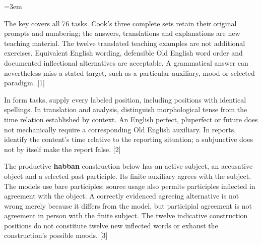 \newcommand{\runningtitle}{Unit 12. Answer key}

\emergencystretch=3em
\newcommand{\itempara}[2]{\par\addvspace{3pt}\noindent\hangindent=1.8em\hangafter=1\makebox[1.8em][l]{#1.}#2\par}
\newcommand{\reserve}[1]{\par\penalty-100\begingroup\dimen0=\pagegoal\advance\dimen0 by-\pagetotal\ifdim\dimen0<#1\newpage\fi\endgroup}

\raggedright
{}

The key covers all 76 tasks. Cook's three complete sets retain their original prompts and numbering; the answers, translations and explanations are new teaching material. The twelve translated teaching examples are not additional exercises. Equivalent English wording, defensible Old English word order and documented inflectional alternatives are acceptable. A grammatical answer can nevertheless miss a stated target, such as a particular auxiliary, mood or selected paradigm. [1]

In form tasks, supply every labeled position, including positions with identical spellings. In translation and analysis, distinguish morphological tense from the time relation established by context. An English perfect, pluperfect or future does not mechanically require a corresponding Old English auxiliary. In reports, identify the content's time relative to the reporting situation; a subjunctive does not by itself make the report false. [2]

The productive \textbf{habban} construction below has an active subject, an accusative object and a selected past participle. Its finite auxiliary agrees with the subject. The models use bare participles; source usage also permits participles inflected in agreement with the object. A correctly evidenced agreeing alternative is not wrong merely because it differs from the model, but participial agreement is not agreement in person with the finite subject. The twelve indicative construction positions do not constitute twelve new inflected words or exhaust the construction's possible moods. [3]

